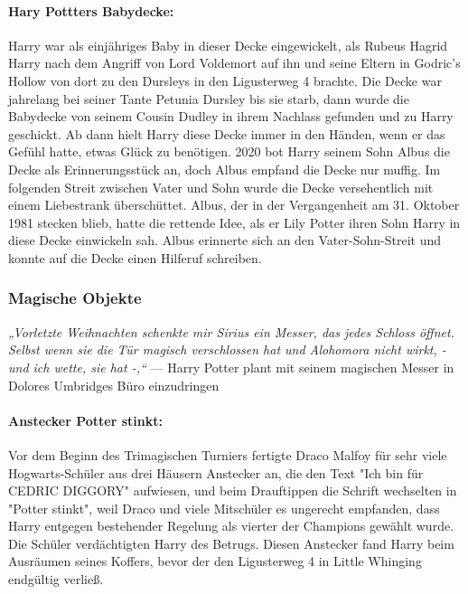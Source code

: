 \documentclass[a4paper, 10pt]{article}
\begin{document}
\paragraph{Hary Pottters Babydecke:}
Harry war als einjähriges Baby in dieser Decke eingewickelt, als Rubeus Hagrid Harry nach dem Angriff von Lord Voldemort auf ihn und seine Eltern in Godric's Hollow von dort zu den Dursleys in den Ligusterweg 4 brachte. Die Decke war jahrelang bei seiner Tante Petunia Dursley bis sie starb, dann wurde die Babydecke von seinem Cousin Dudley in ihrem Nachlass gefunden und zu Harry geschickt. Ab dann hielt Harry diese Decke immer in den Händen, wenn er das Gefühl hatte, etwas Glück zu benötigen. 2020 bot Harry seinem Sohn Albus die Decke als Erinnerungsstück an, doch Albus empfand die Decke nur muffig. Im folgenden Streit zwischen Vater und Sohn wurde die Decke versehentlich mit einem Liebestrank überschüttet. Albus, der in der Vergangenheit am 31. Oktober 1981 stecken blieb, hatte die rettende Idee, als er Lily Potter ihren Sohn Harry in diese Decke einwickeln sah. Albus erinnerte sich an den Vater-Sohn-Streit und konnte auf die Decke einen Hilferuf schreiben.

\subsubsection*{\large Magische Objekte}
\textit{„Vorletzte Weihnachten schenkte mir Sirius ein Messer, das jedes Schloss öffnet. Selbst wenn sie die Tür magisch verschlossen hat und Alohomora nicht wirkt, - und ich wette, sie hat -,“}
\vspace{10pt}
\newline
{}  
— Harry Potter plant mit seinem magischen Messer in Dolores Umbridges Büro einzudringen
\vspace{10pt}
\newline
{}  
\paragraph{Anstecker Potter stinkt:}

Vor dem Beginn des Trimagischen Turniers fertigte Draco Malfoy für sehr viele Hogwarts-Schüler aus drei Häusern Anstecker an, die den Text "Ich bin für CEDRIC DIGGORY" aufwiesen, und beim Drauftippen die Schrift wechselten in "Potter stinkt", weil Draco und viele Mitschüler es ungerecht empfanden, dass Harry entgegen bestehender Regelung als vierter der Champions gewählt wurde. Die Schüler verdächtigten Harry des Betrugs. Diesen Anstecker fand Harry beim Ausräumen seines Koffers, bevor der den Ligusterweg 4 in Little Whinging endgültig verließ.
\end{document}
